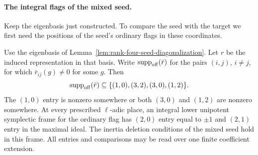 \paragraph{The integral flags of the mixed seed.}
\label{par:count-two-seed-flags}
Keep the eigenbasis just constructed. To compare the seed with the target we first
need the positions of the seed's ordinary flags in these coordinates.

\begin{lemma}
\label{lem:rank-four-mixed-flags}
Use the eigenbasis of Lemma~\ref{lem:rank-four-seed-diagonalization}.
Let \(r\) be the induced representation in that basis. Write \(\operatorname{supp}_{\rm off}(\bar r)\) for the pairs \((i,j)\), \(i\ne j\), for which \(\bar r_{ij}(g)\ne0\) for some \(g\). Then 
\[
 \operatorname{supp}_{\rm off}(\bar r)\subseteq\{(1,0),(3,2),(3,0),(1,2)\}.
\]
 The \((1,0)\) entry is nonzero
somewhere or both \((3,0)\) and \((1,2)\) are nonzero somewhere.
At every prescribed \(\ell\)-adic place, an integral lower
unipotent symplectic frame for the ordinary flag has \((2,0)\)
entry equal to \(\pm1\) and \((2,1)\) entry in the maximal ideal.
The inertia deletion conditions of the mixed seed hold in this
frame. All entries and comparisons may be read over one finite
coefficient extension.
\end{lemma}

